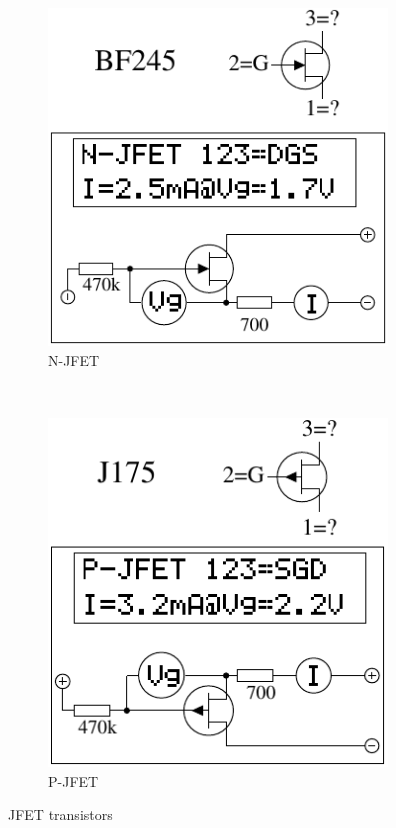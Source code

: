 \begin{figure}[H]
  \begin{subfigure}[b]{9cm}
    \centering
    \includegraphics[width=9cm]{../FIG/JFET_BF245.pdf}
    \caption{N-JFET}
    \label{fig:N-JFET}
  \end{subfigure}
  ~
  \begin{subfigure}[b]{9cm}
    \centering
    \includegraphics[width=9cm]{../FIG/JFET_J175.pdf}
    \caption{P-JFET}
    \label{fig:P-JFET}
  \end{subfigure}
  \caption{JFET transistors}
\end{figure}



